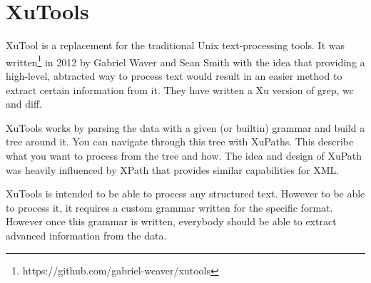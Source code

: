 \chapter{XuTools}

XuTool \cite{xutools} is a replacement for the traditional Unix text-processing tools. It was written\footnote{https://github.com/gabriel-weaver/xutools} in 2012 by Gabriel Waver and Sean Smith with the idea that providing a high-level, abtracted way to process text would result in an easier method to extract certain information from it. They have written a Xu version of grep, wc and diff.


XuTools works by parsing the data with a given (or builtin) grammar and build a tree around it. You can navigate through this tree with XuPaths. This describe what you want to process from the tree and how. The idea and design of XuPath was heavily influenced by XPath that provides similar capabilities for XML.

XuTools is intended to be able to process any structured text. However to be able to process it, it requires a custom grammar written for the specific format. However once this grammar is written, everybody should be able to extract advanced information from the data.


